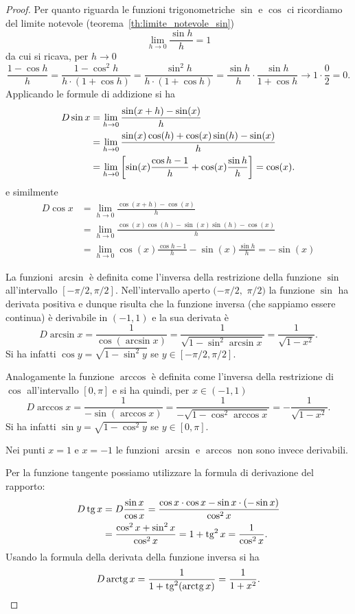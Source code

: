 \begin{proof}
Per quanto riguarda le funzioni trigonometriche 
$\sin$ e $\cos$ ci ricordiamo del limite notevole
(teorema~\ref{th:limite_notevole_sin})
\[
  \lim_{h\to 0}\frac{\sin h}{h} = 1
\]
da cui si ricava, per $h\to 0$ 
\[
\frac{1-\cos h}{h}
= \frac{1-\cos^2 h}{h\cdot(1+\cos h)}
= \frac{\sin^2 h}{h\cdot (1+\cos h)}
= \frac{\sin h}{h} \cdot \frac{\sin h}{1+\cos h}
\to 1 \cdot \frac{0}{2} = 0.
\]
Applicando le formule di addizione si ha
\begin{align*}
  D \sin x
  &= \lim_{h\to 0}\frac{\sin(x+h)-\sin(x)}{h} \\
  &= \lim_{h\to 0}\frac{\sin(x)\cos(h) + \cos(x)\sin(h) - \sin(x)}{h} \\
  &= \lim_{h\to 0}{\left[ \sin(x) \frac{\cos h-1}{h} + \cos(x) \frac{\sin h}{h} \right]} 
  = \cos(x).
\end{align*}
e similmente
\begin{align*}
  D \cos x
  &= \lim_{h\to 0}\frac{\cos(x+h)-\cos(x)}{h} \\
  &= \lim_{h\to 0}\frac{\cos(x)\cos(h) - \sin(x)\sin(h) - \cos(x)}{h} \\
  &= \lim_{h\to 0}\cos(x) \frac{\cos h-1}{h} - \sin(x) \frac{\sin h}{h} = -\sin(x)
\end{align*}

La funzioni $\arcsin$ è definita come l'inversa della restrizione della funzione $\sin$ all'intervallo $[-\pi/2, \pi/2]$.
Nell'intervallo aperto $(-\pi/2,$ $\pi/2)$ la funzione $\sin$ ha derivata positiva e dunque risulta che la funzione inversa (che sappiamo essere continua) è derivabile in $(-1,1)$ e la sua derivata è
\[
D\arcsin x
= \frac{1}{\cos(\arcsin x)}
= \frac{1}{\sqrt{1-\sin^2 \arcsin x}}
= \frac{1}{\sqrt{1-x^2}}.
\]
Si ha infatti $\cos y = \sqrt{1-\sin^2 y}$ se $y\in [-\pi/2, \pi/2]$.

Analogamente la funzione $\arccos$ è definita come l'inversa della restrizione di $\cos$ all'intervallo $[0,\pi]$ e si ha quindi,
per $x\in (-1,1)$
\[
D \arccos x
 = \frac{1}{-\sin(\arccos x)}
 = \frac{1}{-\sqrt{1-\cos^2 \arccos x}}
 = -\frac{1}{\sqrt{1-x^2}}.
\]
Si ha infatti $\sin y = \sqrt{1-\cos^2 y}$ se $y\in[0,\pi]$.

Nei punti $x=1$ e $x=-1$ le funzioni $\arcsin$ e $\arccos$ non sono invece derivabili.

Per la funzione tangente possiamo utilizzare la formula di derivazione del rapporto:
\begin{align*}
  D \operatorname{tg} x &= D \frac{\sin x }{\cos x}
   = \frac{\cos x \cdot \cos x - \sin x \cdot (-\sin x)}{\cos^2 x} \\
   &= \frac{\cos^2 x + \sin^2 x}{\cos^2 x}
   = 1 + \operatorname{tg}^2 x = \frac{1}{\cos^2 x}.
\end{align*}
Usando la formula della derivata della funzione inversa si ha
\[
  D \operatorname{arctg} x = \frac{1}{1+\operatorname{tg}^2(\operatorname{arctg} x)}
  = \frac{1}{1+x^2}.
\]


\end{proof}
